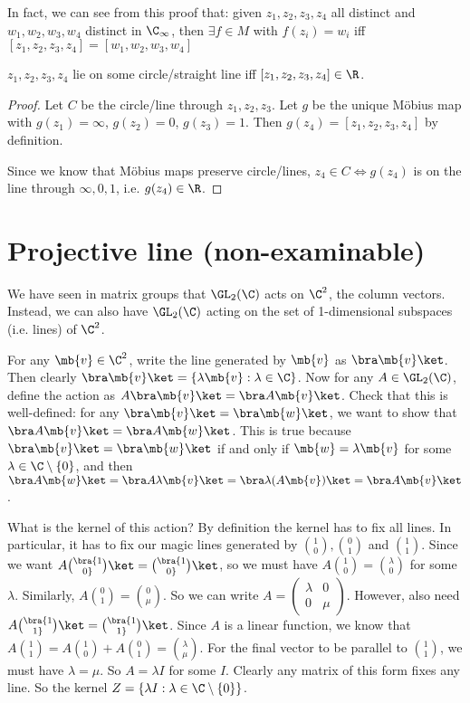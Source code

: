 \documentclass[a4pape]{article}
\begin{document}
In fact, we can see from this proof that: given $z_1, z_2, z_3, z_4$ all distinct and $w_1, w_2, w_3, w_4$ distinct in $\C_\infty$, then $\exists f\in M$ with $f(z_i) = w_i$ iff $[z_1, z_2, z_3, z_4] = [w_1, w_2, w_3, w_4]$

\begin{cor}
  $z_1, z_2, z_3, z_4$ lie on some circle/straight line iff $[z_1, z_2, z_3, z_4]\in \R$.
\end{cor}

\begin{proof}
  Let $C$ be the circle/line through $z_1, z_2, z_3$. Let $g$ be the unique M\"obius map with $g(z_1) = \infty$, $g(z_2) = 0$, $g(z_3) = 1$. Then $g(z_4) = [z_1, z_2, z_3, z_4]$ by definition.

  Since we know that M\"obius maps preserve circle/lines, $z_4\in C \Leftrightarrow g(z_4)$ is on the line through $\infty, 0, 1$, i.e. $g(z_4) \in \R$.
\end{proof}

\section{Projective line (non-examinable)}
We have seen in matrix groups that $\GL_2(\C)$ acts on $\C^2$, the column vectors. Instead, we can also have $\GL_2(\C)$ acting on the set of 1-dimensional subspaces (i.e. lines) of $\C^2$.

For any $\mb{v}\in \C^2$, write the line generated by $\mb{v}$ as $\bra \mb{v}\ket$. Then clearly $\bra \mb{v} \ket = \{\lambda \mb{v}: \lambda\in \C\}$. Now for any $A\in \GL_2(\C)$, define the action as $A\bra \mb{v}\ket = \bra A\mb{v}\ket$. Check that this is well-defined: for any $\bra \mb{v} \ket = \bra \mb{w}\ket$, we want to show that $\bra A\mb{v}\ket = \bra A\mb{w}\ket$. This is true because $\bra \mb{v} \ket = \bra \mb{w}\ket$ if and only if $\mb{w} = \lambda \mb{v}$ for some $\lambda\in \C\setminus\{0\}$, and then $\bra A\mb{w}\ket = \bra A\lambda\mb{v}\ket = \bra \lambda (A\mb{v})\ket = \bra A\mb{v}\ket$.

What is the kernel of this action? By definition the kernel has to fix all lines. In particular, it has to fix our magic lines generated by ${1\choose 0}, {0\choose 1}$ and ${1\choose 1}$. Since we want $A\bra {1\choose 0}\ket = \bra {1\choose 0}\ket$, so we must have $A{1\choose 0} = {\lambda \choose 0}$ for some $\lambda$. Similarly, $A{0\choose 1} = {0\choose \mu}$. So we can write $A = 
\begin{pmatrix}
  \lambda & 0\\
  0 & \mu
\end{pmatrix}$. However, also need $A\bra {1\choose 1}\ket = \bra{1\choose 1}\ket$. Since $A$ is a linear function, we know that $A {1\choose 1} = A {1\choose 0} + A {0\choose 1} = {\lambda \choose \mu}$. For the final vector to be parallel to ${1\choose 1}$, we must have $\lambda = \mu$. So $A = \lambda I$ for some $I$. Clearly any matrix of this form fixes any line. So the kernel $Z = \{\lambda I: \lambda\in \C\setminus\{0\}\}$.
\end{document}
